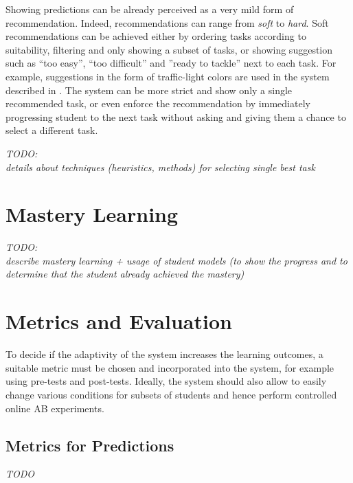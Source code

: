 Showing predictions can be already perceived as a very mild form of recommendation.
Indeed, recommendations can range from \emph{soft} to \emph{hard}.
Soft recommendations can be achieved either by
  ordering tasks according to suitability,
  filtering and only showing a subset of tasks,
  or showing suggestion such as
  ``too easy'', ``too difficult'' and ''ready to tackle'' next to each task.
For example, suggestions in the form of traffic-light colors
  are used in the system described in \cite{its-programming}.
The system can be more strict and show only a single recommended task,
  or even enforce the recommendation by immediately progressing student to
  the next task without asking and giving them a chance to select a different task.

\bigskip
\emph{TODO:\\details about techniques (heuristics, methods) for selecting single best task}

\section{Mastery Learning}
\label{sec:mastery-learning}

\emph{TODO:\\describe mastery learning + usage of student models%
(to show the progress and to determine that the student already achieved the mastery)}


\section{Metrics and Evaluation}
\label{sec:metrics-and-evaluation}

To decide if the adaptivity of the system increases the learning outcomes,
  a suitable metric must be chosen and incorporated into the system,
  for example using pre-tests and post-tests.
Ideally, the system should also allow to easily change various conditions
  for subsets of students and hence perform controlled online AB experiments.


\subsection{Metrics for Predictions}

\emph{TODO}

%


